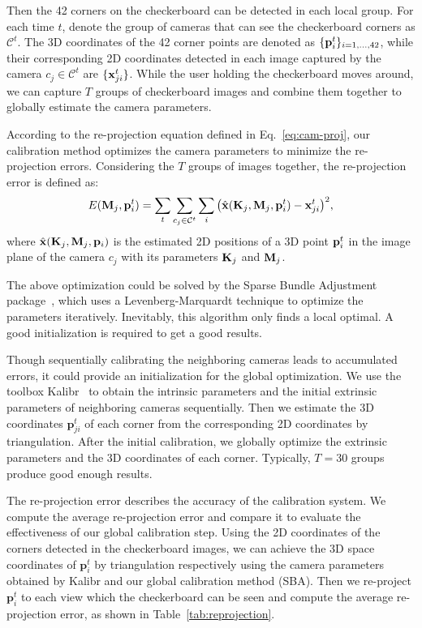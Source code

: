 %
Then the 42 corners on the checkerboard can be detected in each local group.
%
For each time $t$, denote the group of cameras that can see the checkerboard corners as $\mathcal{C}^t$. The 3D coordinates of the 42 corner points are denoted as $\{\mathbf{p}^{t}_{i}\}_{i=1,\ldots, 42}$, while their corresponding 2D coordinates detected in each image captured by the camera $c_j \in \mathcal{C}^{t}$ are $\{\mathbf{x}^{t}_{ji}\}$.
%
While the user holding the checkerboard moves around, we can capture $T$ groups of checkerboard images and combine them together to globally estimate the camera parameters.
%


According to the re-projection equation defined in Eq.~\ref{eq:cam-proj}, our calibration method optimizes the camera parameters to minimize the re-projection errors. Considering the $T$ groups of images together, the re-projection error is defined as:
%
\begin{equation} \label{eq:global-proj-error}
E(\mathbf{M}_{j},\mathbf{p}^{t}_{i})=\sum_{t}\sum_{c_j\in \mathcal{C}^{t}}\sum_{i} \big( \hat{\mathbf{x}}(\mathbf{K}_{j},\mathbf{M}_{j}, \mathbf{p}^{t}_{i})-\mathbf{x}^{t}_{ji} \big)^{2},
\end{equation}
%
where $\hat{\mathbf{x}}(\mathbf{K}_{j},\mathbf{M}_{j}, \mathbf{p}_{i})$ is the estimated 2D positions of a 3D point $\mathbf{p}^{t}_{i}$ in the image plane of the camera $c_j$ with its parameters $\mathbf{K}_j$ and $\mathbf{M}_j$.


The above optimization could be solved by the Sparse Bundle Adjustment package~\cite{lour09}, which uses a Levenberg-Marquardt technique to optimize the parameters iteratively.
Inevitably, this algorithm only finds a local optimal.
A good initialization is required to get a good results.


Though sequentially calibrating the neighboring cameras leads to accumulated errors, it could provide an initialization for the global optimization.
%
We use the toolbox Kalibr~\cite{Maye2013Self} to obtain the intrinsic parameters and the initial extrinsic parameters of neighboring cameras sequentially.
%
Then we estimate the 3D coordinates $\mathbf{p}^{t}_{ji}$ of each corner from the corresponding 2D coordinates by triangulation.
%
After the initial calibration, we globally optimize the extrinsic parameters and the 3D coordinates of each corner.
Typically, $T=30$ groups produce good enough results.

The re-projection error describes the accuracy of the calibration system.
We compute the average re-projection error and compare it to evaluate the effectiveness of our global calibration step.
%
Using the 2D coordinates of the corners detected in the checkerboard images, we can achieve the 3D space coordinates of $\mathbf{p}^{t}_{i}$ by triangulation respectively using the camera parameters obtained by Kalibr and our global calibration method (SBA).
Then we re-project $\mathbf{p}^{t}_{i}$ to each view which the checkerboard can be seen and compute the average re-projection error, as shown in Table~\ref{tab:reprojection}.

